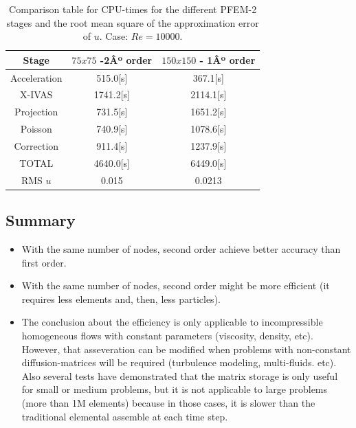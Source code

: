 \begin{table}[htbp]
\begin{center}
{\footnotesize
\begin{tabular}[h]{||c|c|c||}
    \hline
      Stage & $75x75$  -2Âº order & $150x150$ - 1Âº order\\
      \hline
      \hline
	Acceleration & 515.0[s]& 367.1[s]\\
	X-IVAS & 1741.2[s]& 2114.1[s] \\
	Projection & 731.5[s]& 1651.2[s]\\
	Poisson & 740.9[s]& 1078.6[s]\\
	Correction & 911.4[s]& 1237.9[s]\\
      \hline
	TOTAL & 4640.0[s]& 6449.0[s]\\
      \hline
      \hline
	RMS $u$ & 0.015 & 0.0213 \\
      \hline
      \hline
\end{tabular}
}
\caption{\label{Tabla:times_Re_10000} Comparison table for CPU-times for the different PFEM-2 stages and the root mean square of the approximation error of $u$. Case: $Re=10000$.}
\end{center}
\end{table}

\newpage

\subsection{Summary}

  \begin{itemize}
   \item With the same number of nodes, second order achieve better accuracy than first order.
   \item With the same number of nodes, second order might be more efficient (it requires less elements and, then, less particles).
   \item The conclusion about the efficiency is only applicable to incompressible homogeneous flows with constant parameters (viscosity, density, etc). However, that asseveration can be modified when problems with non-constant diffusion-matrices will be required (turbulence modeling, multi-fluids. etc). Also several tests have demonstrated that the matrix storage is only useful for small or medium problems, but it is not applicable to large problems (more than 1M elements) because in those cases, it is slower than the traditional elemental assemble at each time step.
  \end{itemize}
